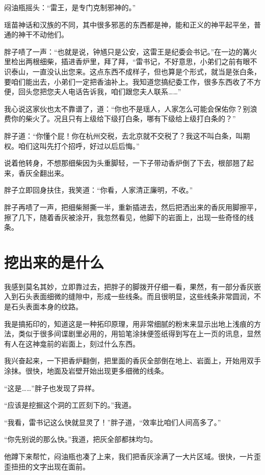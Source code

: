 闷油瓶摇头：“雷王，是专门克制邪神的。”

瑶苗神话和汉族的不同，其中很多邪恶的东西都是神，能和正义的神平起平坐，普通的神干不动他们。

胖子啧了一声：“也就是说，钟馗只是公安，这雷王是纪委会书记。”在一边的篝火里检出两根细柴，插进香炉里，拜了拜，“雷书记，不好意思，小弟们之前有眼不识泰山，一直没认出您来。这点东西不成样子，但也算是个形式，就当是张白条，要咱们能出去，小弟们一定把香油补上。我知道您搞纪委工作，很多东西收了不方便，回头您把您夫人电话告诉我，咱们跟您夫人联系……”

我心说这家伙也太不靠谱了，道：“你也不是瑶人，人家怎么可能会保佑你？别浪费你的柴火了。况且只有上级给下级打白条，哪有下级给上级打白条的？”

胖子道：“你懂个屁！你在杭州交税，去北京就不交税了？我这不叫白条，叫期权。咱们这叫先打个招呼，好过以后后悔。”

说着他转身，不想那细柴因为头重脚轻，一下子带动香炉倒了下去，根部翘了起来，香灰全翻出来。

胖子立即回身扶住，我笑道：“你看，人家清正廉明，不收。”

胖子再啧了一声，把细柴掰撕一半，重新插进去，然后把洒出来的香灰用脚擦平，擦了几下，随着香灰被涂开，我忽然看见，他脚下的岩面上，出现一些奇怪的线条。

\chapter{挖出来的是什么}

我感到莫名其妙，立即靠过去，把胖子的脚拨开仔细一看，果然，有一部分香灰嵌入到石头表面细微的缝隙中，形成一些线条。而且很明显，这些线条非常圆润，不是石头表面本身的纹路。

我是搞拓印的，知道这是一种拓印原理，用非常细腻的粉末来显示出地上浅痕的方法，类似于很多间谍剧里必用的，用铅笔涂抹便签纸得到写在上一页的讯息，显然有人在这神龛前的岩面上，刻过什么东西。

我兴奋起来，一下把香炉翻倒，把里面的香灰全部倒在地上、岩面上，开始用双手涂抹。很快，地面及岩壁开始出现更多细微的线条。

“这是……”胖子也发现了异样。

“应该是挖掘这个洞的工匠刻下的。”我道。

“我看，雷书记这么快就显灵了！”胖子道，“效率比咱们人间高多了。”

“你先别说的那么快。”我道，把灰全部都抹均匀。

他蹲下来帮忙，闷油瓶也凑了上来，我们把香灰涂满了一大片区域。很快，一片歪歪扭扭的文字出现在面前。

